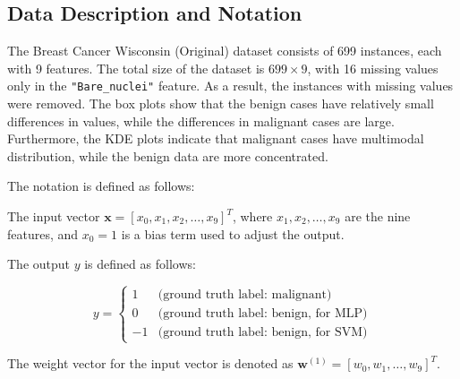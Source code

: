 \subsection{Data Description and Notation}

The Breast Cancer Wisconsin (Original) dataset consists of 699 instances, each with 9 features. The total size of the dataset is \(699 \times 9\), with 16 missing values only in the \texttt{"Bare\_nuclei"} feature. As a result, the instances with missing values were removed. The box plots show that the benign cases have relatively small differences in values, while the differences in malignant cases are large. Furthermore, the KDE plots indicate that malignant cases have multimodal distribution, while the benign data are more concentrated.

The notation is defined as follows: 

The input vector \hbox{\(\mathbf{x} = [x_0, x_1, x_2, \ldots, x_9]^T\)}, where \(x_1, x_2, \ldots, x_9\) are the nine features, and \(x_0 = 1\) is a bias term used to adjust the output.

The output \(y\) is defined as follows:

\[
y = 
\begin{cases} 
1 & \text{(ground truth label: malignant)} \\
0 & \text{(ground truth label: benign, for MLP)} \\
-1 & \text{(ground truth label: benign, for SVM)}
\end{cases}
\]

The weight vector for the input vector is denoted as \hbox{\(\mathbf{w}^{(1)} = [w_0, w_1, \ldots, w_9]^T\)}.

